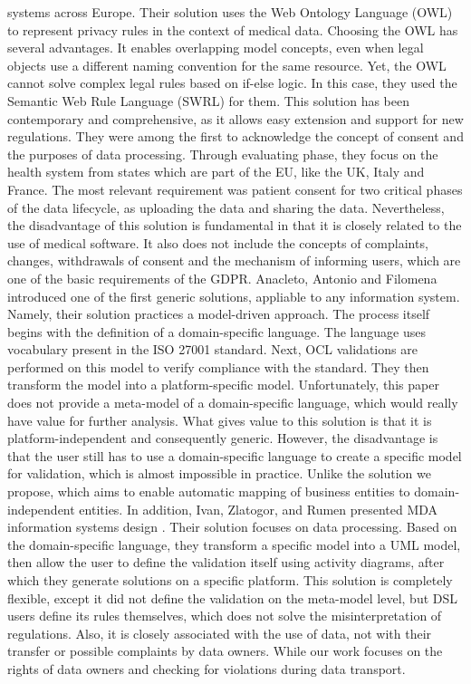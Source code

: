 \documentclass[11pt,english]{article}
\begin{document}
systems across Europe. Their solution uses the Web Ontology Language (OWL) \cite{owl} to represent privacy rules in the context of medical data. Choosing the OWL has several advantages. It enables overlapping model concepts, even when legal objects use a different naming convention for the same resource. Yet, the OWL cannot solve complex legal rules based on if-else logic. In this case, they used the Semantic Web Rule Language (SWRL) \cite{swrl} for them. This solution has been contemporary and comprehensive, as it allows easy extension and support for new regulations. They were among the first to acknowledge the concept of consent and the purposes of data processing. Through evaluating phase, they focus on the health system from states which are part of the EU, like the UK, Italy and France. The most relevant requirement was patient consent for two critical phases of the data lifecycle, as uploading the data and sharing the data. Nevertheless, the disadvantage of this solution is fundamental in that it is closely related to the use of medical software. It also does not include the concepts of complaints, changes, withdrawals of consent and the mechanism of informing users, which are one of the basic requirements of the GDPR. \newline  Anacleto, Antonio and Filomena \cite{correia2017model} introduced one of the first generic solutions, appliable to any information system. Namely, their solution practices a model-driven approach. The process itself begins with the definition of a domain-specific language. The language uses vocabulary present in the ISO 27001 standard. Next, OCL validations are performed on this model to verify compliance with the standard. They then transform the model into a platform-specific model. Unfortunately, this paper does not provide a meta-model of a domain-specific language, which would really have value for further analysis. What gives value to this solution is that it is platform-independent and consequently generic. However, the disadvantage is that the user still has to use a domain-specific language to create a specific model for validation, which is almost impossible in practice. Unlike the solution we propose, which aims to enable automatic mapping of business entities to domain-independent entities. In addition, Ivan, Zlatogor, and Rumen presented MDA information systems design \cite{gaidarskimodel}. Their solution focuses on data processing. Based on the domain-specific language, they transform a specific model into a UML model, then allow the user to define the validation itself using activity diagrams, after which they generate solutions on a specific platform. This solution is completely flexible, except it did not define the validation on the meta-model level, but DSL users define its rules themselves, which does not solve the misinterpretation of regulations. Also, it is closely associated with the use of data, not with their transfer or possible complaints by data owners. While our work focuses on the rights of data owners and checking for violations during data transport.
\end{document}
